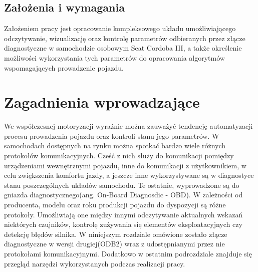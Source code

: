 \documentclass[12pt]{article} %
\numberwithin{equation}{subsection}
\numberwithin{figure}{section}
\numberwithin{table}{section}
\begin{document}
	\subsection{Założenia i wymagania}
		\hspace{0.5cm}Założeniem pracy jest opracowanie kompleksowego układu umożliwiającego odczytywanie, wizualizację oraz kontrolę parametrów odbieranych przez złącze diagnostyczne w samochodzie osobowym Seat Cordoba III, a także określenie możliwości wykorzystania tych parametrów do opracowania algorytmów wspomagających prowadzenie pojazdu.
	
		\newpage

\section{Zagadnienia wprowadzające}
	\hspace{0.5cm}We współczesnej motoryzacji wyraźnie można zauważyć tendencję automatyzacji procesu prowadzenia pojazdu oraz kontroli stanu jego parametrów. W samochodach dostępnych na rynku można spotkać bardzo wiele różnych protokołów komunikacyjnych. Cześć z nich służy do komunikacji pomiędzy urządzeniami wewnętrznymi pojazdu, inne do komunikacji z użytkownikiem, w celu zwiększenia komfortu jazdy, a jeszcze inne wykorzystywane są w diagnostyce stanu poszczególnych układów samochodu. Te ostatnie, wyprowadzone są do gniazda diagnostycznego(ang. On-Board Diagnosdic - OBD). W zależności od producenta, modelu oraz roku produkcji pojazdu do dyspozycji są różne protokoły. Umożliwiają one między innymi odczytywanie aktualnych wskazań niektórych czujników, kontrolę zużywania się elementów eksploatacyjnych czy detekcję błędów silnika. W niniejszym rozdziale omówione zostało złącze diagnostyczne w wersji drugiej(ODB2) wraz z udostępnianymi przez nie protokołami komunikacyjnymi. Dodatkowo w ostatnim podrozdziale znajduje się przegląd narzędzi wykorzystanych podczas realizacji pracy.
\end{document}
